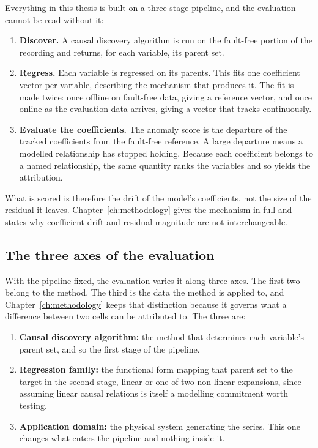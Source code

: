 Everything in this thesis is built on a three-stage pipeline, and the evaluation cannot be read without it:

\begin{enumerate}
  \item \textbf{Discover.} A causal discovery algorithm is run on the fault-free portion of the recording and returns, for each variable, its parent set.
  \item \textbf{Regress.} Each variable is regressed on its parents. This fits one coefficient vector per variable, describing the mechanism that produces it. The fit is made twice: once offline on fault-free data, giving a reference vector, and once online as the evaluation data arrives, giving a vector that tracks continuously.
  \item \textbf{Evaluate the coefficients.} The anomaly score is the departure of the tracked coefficients from the fault-free reference. A large departure means a modelled relationship has stopped holding. Because each coefficient belongs to a named relationship, the same quantity ranks the variables and so yields the attribution.
\end{enumerate}

What is scored is therefore the drift of the model's coefficients, not the size of the residual it leaves. Chapter~\ref{ch:methodology} gives the mechanism in full and states why coefficient drift and residual magnitude are not interchangeable.

\subsection{The three axes of the evaluation}
\label{sec:intro-axes}

With the pipeline fixed, the evaluation varies it along three axes. The first two belong to the method. The third is the data the method is applied to, and Chapter~\ref{ch:methodology} keeps that distinction because it governs what a difference between two cells can be attributed to. The three are:

\begin{enumerate}
  \item \textbf{Causal discovery algorithm:} the method that determines each variable's parent set, and so the first stage of the pipeline.
  \item \textbf{Regression family:} the functional form mapping that parent set to the target in the second stage, linear or one of two non-linear expansions, since assuming linear causal relations is itself a modelling commitment worth testing.
  \item \textbf{Application domain:} the physical system generating the series. This one changes what enters the pipeline and nothing inside it.
\end{enumerate}


